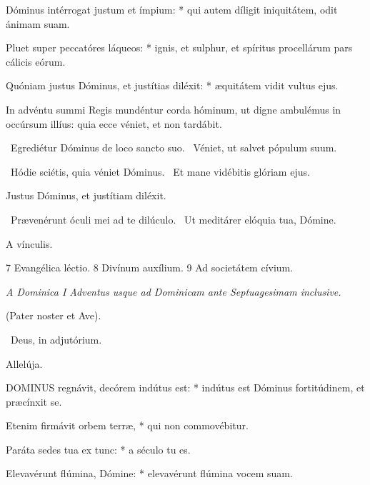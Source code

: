 Dóminus intérrogat justum et ímpium: * qui autem díligit iniquitátem, odit ánimam suam.

Pluet super peccatóres láqueos: * ignis, et sulphur, et spíritus procellárum pars cálicis eórum.

Quóniam justus Dóminus, et justítias diléxit: * æquitátem vidit vultus ejus.

  In advéntu summi Regis mundéntur corda hóminum, ut digne ambulémus in occúrsum illíus: quia ecce véniet, et non tardábit.

\V\ Egrediétur Dóminus de loco sancto suo. \R\ Véniet, ut salvet pópulum suum.

 \V\ Hódie sciétis, quia véniet Dóminus. \R\ Et mane vidébitis glóriam ejus.

  Justus Dóminus, et justítiam diléxit.

\V\ Prævenérunt óculi mei ad te dilúculo. \R\ Ut meditárer elóquia tua, Dómine.

 A vínculis.

 7 Evangélica léctio. 8 Divínum auxílium. 9 Ad societátem cívium.

\sectionornament

\label{dom:adlaudesI}

\textit{A Dominica I Adventus usque ad Dominicam ante Septuagesimam inclusive.}

(Pater noster et Ave).

\V\ Deus, in adjutórium.


  Allelúja.



\lettrine[lines=2]{D}{OMINUS} regnávit, decórem indútus est: * indútus est Dóminus fortitúdinem, et præcínxit se.

Etenim firmávit orbem terræ, * qui non commovébitur.

Paráta sedes tua ex tunc: * a século tu es.

Elevavérunt flúmina, Dómine: * elevavérunt flúmina vocem suam.

